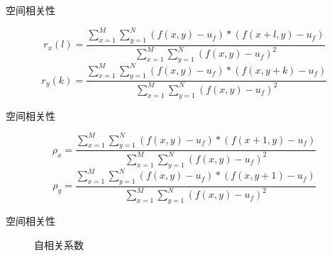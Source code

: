 \documentclass[aspectratio=43]{beamer}
\begin{document}
\begin{frame}{空间相关性}
\begin{card}[图像自相关函数]
\begin{equation}
r_x\left(l\right)=\frac{\sum\limits_{x=1}^{M}\sum\limits_{y=1}^{N}\left(f\left(x,y\right)-u_f\right)*\left(f\left(x+l,y\right)-u_f\right)}{\sum\limits_{x=1}^{M}\sum\limits_{y=1}^{N}\left(f\left(x,y\right)-u_f\right)^2}
\end{equation}
\begin{equation}
r_y\left(k\right)=\frac{\sum\limits_{x=1}^{M}\sum\limits_{y=1}^{N}\left(f\left(x,y\right)-u_f\right)*\left(f\left(x,y+k\right)-u_f\right)}{\sum\limits_{x=1}^{M}\sum\limits_{y=1}^{N}\left(f\left(x,y\right)-u_f\right)^2}
\end{equation}
\end{card}
\end{frame}

\begin{frame}{空间相关性}
\begin{card}[自相关系数]
\begin{equation}
\rho_x=\frac{\sum\limits_{x=1}^{M}\sum\limits_{y=1}^{N}\left(f\left(x,y\right)-u_f\right)*\left(f\left(x+1,y\right)-u_f\right)}{\sum\limits_{x=1}^{M}\sum\limits_{y=1}^{N}\left(f\left(x,y\right)-u_f\right)^2} 
\end{equation}
\begin{equation}
\rho_y=\frac{\sum\limits_{x=1}^{M}\sum\limits_{y=1}^{N}\left(f\left(x,y\right)-u_f\right)*\left(f\left(x,y+1\right)-u_f\right)}{\sum\limits_{x=1}^{M}\sum\limits_{y=1}^{N}\left(f\left(x,y\right)-u_f\right)^2}
\end{equation}
\end{card}
\end{frame}

\begin{frame}{空间相关性}
\begin{figure}
  \centering
  \caption{ 自相关系数 }
\end{figure}
\end{frame}
\end{document}
